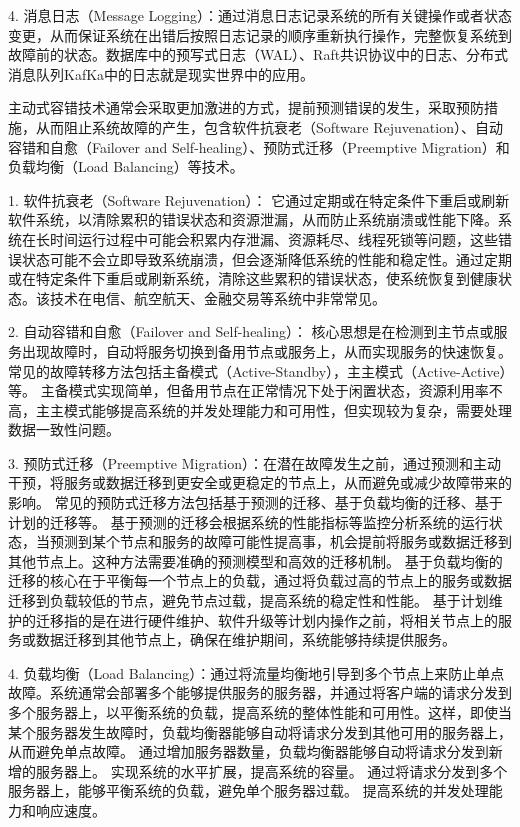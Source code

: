 4. 消息日志（Message Logging）：通过消息日志记录系统的所有关键操作或者状态变更，从而保证系统在出错后按照日志记录的顺序重新执行操作，完整恢复系统到故障前的状态。数据库中的预写式日志（WAL）、Raft共识协议中的日志、分布式消息队列KafKa中的日志就是现实世界中的应用。

主动式容错技术通常会采取更加激进的方式，提前预测错误的发生，采取预防措施，从而阻止系统故障的产生，包含软件抗衰老（Software Rejuvenation）、自动容错和自愈（Failover and Self-healing）、预防式迁移（Preemptive Migration）和负载均衡（Load Balancing）等技术。

1. 软件抗衰老（Software Rejuvenation）： 它通过定期或在特定条件下重启或刷新软件系统，以清除累积的错误状态和资源泄漏，从而防止系统崩溃或性能下降。系统在长时间运行过程中可能会积累内存泄漏、资源耗尽、线程死锁等问题，这些错误状态可能不会立即导致系统崩溃，但会逐渐降低系统的性能和稳定性。通过定期或在特定条件下重启或刷新系统，清除这些累积的错误状态，使系统恢复到健康状态。该技术在电信、航空航天、金融交易等系统中非常常见。


2. 自动容错和自愈（Failover and Self-healing）： 核心思想是在检测到主节点或服务出现故障时，自动将服务切换到备用节点或服务上，从而实现服务的快速恢复。常见的故障转移方法包括主备模式（Active-Standby），主主模式（Active-Active）等。
主备模式实现简单，但备用节点在正常情况下处于闲置状态，资源利用率不高，主主模式能够提高系统的并发处理能力和可用性，但实现较为复杂，需要处理数据一致性问题。

3. 预防式迁移（Preemptive Migration）：在潜在故障发生之前，通过预测和主动干预，将服务或数据迁移到更安全或更稳定的节点上，从而避免或减少故障带来的影响。
常见的预防式迁移方法包括基于预测的迁移、基于负载均衡的迁移、基于计划的迁移等。
基于预测的迁移会根据系统的性能指标等监控分析系统的运行状态，当预测到某个节点和服务的故障可能性提高事，机会提前将服务或数据迁移到其他节点上。这种方法需要准确的预测模型和高效的迁移机制。
基于负载均衡的迁移的核心在于平衡每一个节点上的负载，通过将负载过高的节点上的服务或数据迁移到负载较低的节点，避免节点过载，提高系统的稳定性和性能。
基于计划维护的迁移指的是在进行硬件维护、软件升级等计划内操作之前，将相关节点上的服务或数据迁移到其他节点上，确保在维护期间，系统能够持续提供服务。

4. 负载均衡（Load Balancing）：通过将流量均衡地引导到多个节点上来防止单点故障。系统通常会部署多个能够提供服务的服务器，并通过将客户端的请求分发到多个服务器上，以平衡系统的负载，提高系统的整体性能和可用性。这样，即使当某个服务器发生故障时，负载均衡器能够自动将请求分发到其他可用的服务器上，从而避免单点故障。
通过增加服务器数量，负载均衡器能够自动将请求分发到新增的服务器上。
实现系统的水平扩展，提高系统的容量。
通过将请求分发到多个服务器上，能够平衡系统的负载，避免单个服务器过载。
提高系统的并发处理能力和响应速度。

